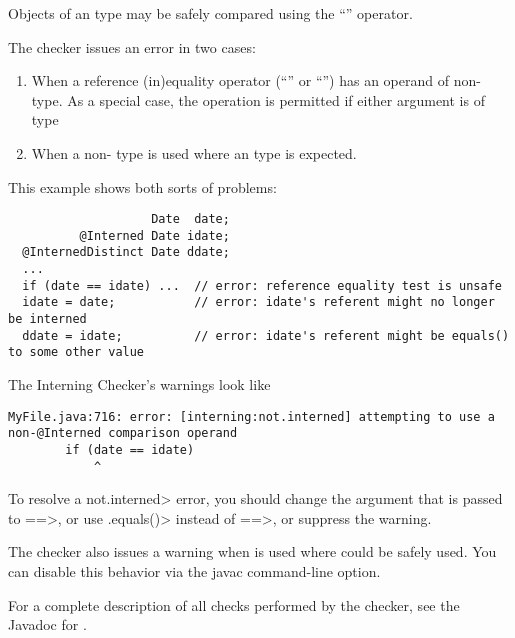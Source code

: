 Objects of an  type may be safely compared using the ``\code{==}''
operator.

The checker issues an error in two cases:

\begin{enumerate}

\item
  When a reference (in)equality operator (``\code{==}'' or ``\code{!=}'')
  has an operand of non- type.
  As a special case, the operation is permitted if either argument is of
   type

\item
  When a non- type is used
  where an  type
  is expected.

\end{enumerate}

This example shows both sorts of problems:

\begin{Verbatim}
                    Date  date;
          @Interned Date idate;
  @InternedDistinct Date ddate;
  ...
  if (date == idate) ...  // error: reference equality test is unsafe
  idate = date;           // error: idate's referent might no longer be interned
  ddate = idate;          // error: idate's referent might be equals() to some other value
\end{Verbatim}

\label{lint-dotequals}

The Interning Checker's warnings look like

\begin{Verbatim}
MyFile.java:716: error: [interning:not.interned] attempting to use a non-@Interned comparison operand
        if (date == idate)
            ^
\end{Verbatim}

\noindent
To resolve a \<not.interned> error, you should change the argument that is
passed to \<==>, or use \<.equals()> instead of \<==>, or suppress the
warning.

The checker also issues a warning when  is used where
\code{==} could be safely used.  You can disable this behavior via the
javac  command-line option.

For a complete description of all checks performed by
  the checker, see the Javadoc for
  .

